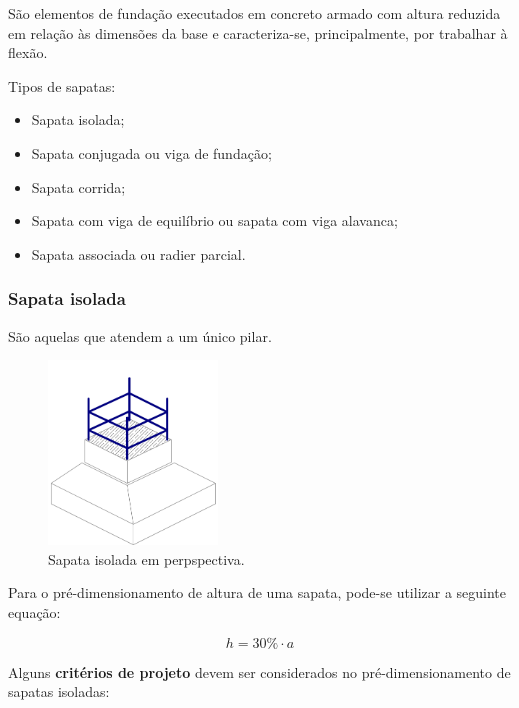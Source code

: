 São elementos de fundação executados em concreto armado com altura reduzida em relação às dimensões da base e caracteriza-se, principalmente, por trabalhar à flexão.

Tipos de sapatas:

\begin{itemize}
	\item Sapata isolada;
	\item Sapata conjugada ou viga de fundação;
	\item Sapata corrida;
	\item Sapata com viga de equilíbrio ou sapata com viga alavanca;
	\item Sapata associada ou radier parcial.
\end{itemize}

\subsubsection{Sapata isolada}

São aquelas que atendem a um único pilar.

\begin{figure}[htb]
	\begin{center}
	\caption{Sapata isolada em perpspectiva.}
    	\includegraphics[width=0.4\textwidth]{Fundacoes-rasas-ou-diretas/Imagens/Sapata-isolada-1.png}
	\end{center}
\end{figure}

Para o pré-dimensionamento de altura de uma sapata, pode-se utilizar a seguinte equação:

\begin{equation}
	h=30\%\cdot a
\end{equation}

Alguns \textbf{critérios de projeto} devem ser considerados no pré-dimensionamento de sapatas isoladas:

